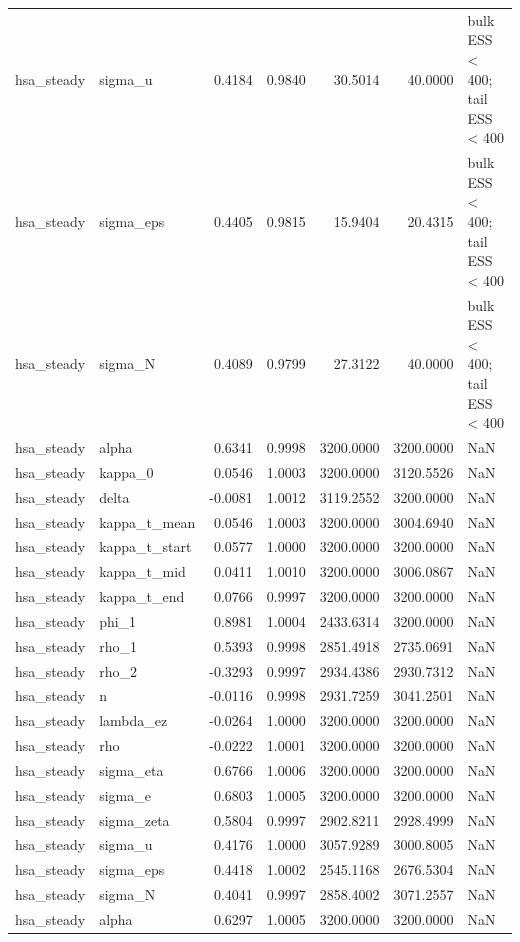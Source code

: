\begin{tabular}{llrrrrl}
hsa\_steady & sigma\_u & 0.4184 & 0.9840 & 30.5014 & 40.0000 & bulk ESS < 400; tail ESS < 400 \\
hsa\_steady & sigma\_eps & 0.4405 & 0.9815 & 15.9404 & 20.4315 & bulk ESS < 400; tail ESS < 400 \\
hsa\_steady & sigma\_N & 0.4089 & 0.9799 & 27.3122 & 40.0000 & bulk ESS < 400; tail ESS < 400 \\
hsa\_steady & alpha & 0.6341 & 0.9998 & 3200.0000 & 3200.0000 & NaN \\
hsa\_steady & kappa\_0 & 0.0546 & 1.0003 & 3200.0000 & 3120.5526 & NaN \\
hsa\_steady & delta & -0.0081 & 1.0012 & 3119.2552 & 3200.0000 & NaN \\
hsa\_steady & kappa\_t\_mean & 0.0546 & 1.0003 & 3200.0000 & 3004.6940 & NaN \\
hsa\_steady & kappa\_t\_start & 0.0577 & 1.0000 & 3200.0000 & 3200.0000 & NaN \\
hsa\_steady & kappa\_t\_mid & 0.0411 & 1.0010 & 3200.0000 & 3006.0867 & NaN \\
hsa\_steady & kappa\_t\_end & 0.0766 & 0.9997 & 3200.0000 & 3200.0000 & NaN \\
hsa\_steady & phi\_1 & 0.8981 & 1.0004 & 2433.6314 & 3200.0000 & NaN \\
hsa\_steady & rho\_1 & 0.5393 & 0.9998 & 2851.4918 & 2735.0691 & NaN \\
hsa\_steady & rho\_2 & -0.3293 & 0.9997 & 2934.4386 & 2930.7312 & NaN \\
hsa\_steady & n & -0.0116 & 0.9998 & 2931.7259 & 3041.2501 & NaN \\
hsa\_steady & lambda\_ez & -0.0264 & 1.0000 & 3200.0000 & 3200.0000 & NaN \\
hsa\_steady & rho & -0.0222 & 1.0001 & 3200.0000 & 3200.0000 & NaN \\
hsa\_steady & sigma\_eta & 0.6766 & 1.0006 & 3200.0000 & 3200.0000 & NaN \\
hsa\_steady & sigma\_e & 0.6803 & 1.0005 & 3200.0000 & 3200.0000 & NaN \\
hsa\_steady & sigma\_zeta & 0.5804 & 0.9997 & 2902.8211 & 2928.4999 & NaN \\
hsa\_steady & sigma\_u & 0.4176 & 1.0000 & 3057.9289 & 3000.8005 & NaN \\
hsa\_steady & sigma\_eps & 0.4418 & 1.0002 & 2545.1168 & 2676.5304 & NaN \\
hsa\_steady & sigma\_N & 0.4041 & 0.9997 & 2858.4002 & 3071.2557 & NaN \\
hsa\_steady & alpha & 0.6297 & 1.0005 & 3200.0000 & 3200.0000 & NaN \\

\end{tabular}
